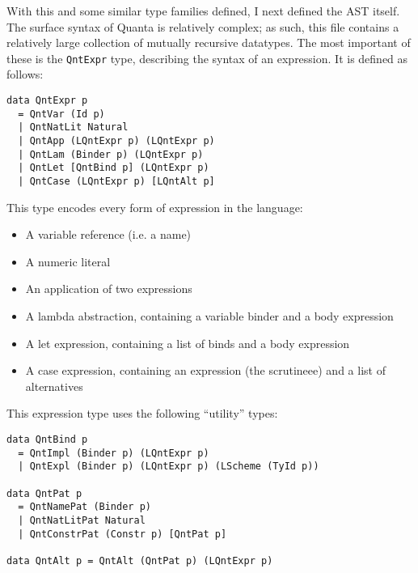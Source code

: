 \documentclass[9pt]{extarticle}
\begin{document}
With this and some similar type families defined, I next defined the AST
itself. The surface syntax of Quanta is relatively complex; as such,
this file contains a relatively large collection of mutually recursive
datatypes. The most important of these is the \verb'QntExpr' type,
describing the syntax of an expression. It is defined as follows:

\begin{verbatim}
data QntExpr p
  = QntVar (Id p)
  | QntNatLit Natural
  | QntApp (LQntExpr p) (LQntExpr p)
  | QntLam (Binder p) (LQntExpr p)
  | QntLet [QntBind p] (LQntExpr p)
  | QntCase (LQntExpr p) [LQntAlt p]
\end{verbatim}

This type encodes every form of expression in the language:
\begin{itemize}
	\item A variable reference (i.e. a name)
	\item A numeric literal
	\item An application of two expressions
	\item A lambda abstraction, containing a variable binder and a body expression
	\item A let expression, containing a list of binds and a body expression
	\item A case expression, containing an expression (the scrutineee) and a list of alternatives
\end{itemize}

This expression type uses the following ``utility'' types:

\begin{verbatim}
data QntBind p
  = QntImpl (Binder p) (LQntExpr p)
  | QntExpl (Binder p) (LQntExpr p) (LScheme (TyId p))

data QntPat p
  = QntNamePat (Binder p)
  | QntNatLitPat Natural
  | QntConstrPat (Constr p) [QntPat p]

data QntAlt p = QntAlt (QntPat p) (LQntExpr p)
\end{verbatim}
\end{document}
